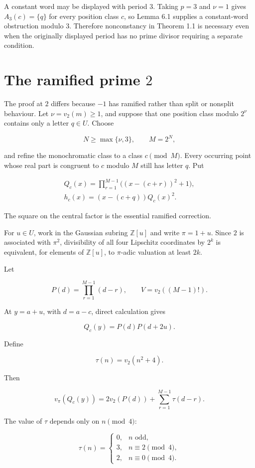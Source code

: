 \documentclass[11pt]{article}
\numberwithin{equation}{section}
\begin{document}
A constant word may be displayed with period $3$. Taking $p=3$ and $\nu=1$
gives $A_3(c)=\{q\}$ for every position class $c$, so Lemma 6.1 supplies a
constant-word obstruction modulo $3$. Therefore nonconstancy in Theorem 1.1
is necessary even when the originally displayed period has no prime divisor
requiring a separate condition.

\section{The ramified prime \texorpdfstring{$2$}{2}}


The proof at $2$ differs because $-1$ has ramified rather than split or
nonsplit behaviour. Let $\nu=v_2(m)\ge1$, and suppose that one position class
modulo $2^\nu$ contains only a letter $q\in U$. Choose

\nopagebreak[4]
\[
N\ge\max\{\nu,3\},
\qquad
M=2^N,
\]

and refine the monochromatic class to a class $c\pmod M$. Every occurring
point whose real part is congruent to $c$ modulo $M$ still has letter $q$.
Put

\nopagebreak
\[
\begin{gathered}
Q_c(x)=\prod_{r=1}^{M-1}\bigl((x-(c+r))^2+1\bigr),\\[0.4em]
h_c(x)=(x-(c+q))Q_c(x)^2.
\end{gathered}
\]

The square on the central factor is the essential ramified correction.

For $u\in U$, work in the Gaussian subring $\mathbb Z[u]$ and write
$\pi=1+u$. Since $2$ is associated with $\pi^2$, divisibility of all four
Lipschitz coordinates by $2^k$ is equivalent, for elements of
$\mathbb Z[u]$, to $\pi$-adic valuation at least $2k$.

Let

\nopagebreak[4]
\[
P(d)=\prod_{r=1}^{M-1}(d-r),
\qquad
V=v_2((M-1)!).
\]

At $y=a+u$, with $d=a-c$, direct calculation gives

\nopagebreak[4]
\[
Q_c(y)=P(d)P(d+2u).
\]

Define

\nopagebreak[4]
\[
\tau(n)=v_2(n^2+4).
\]

Then

\nopagebreak[4]
\[
v_\pi(Q_c(y))
=2v_2(P(d))+\sum_{r=1}^{M-1}\tau(d-r).
\]

The value of $\tau$ depends only on $n\pmod4$:

\nopagebreak[4]
\[
\tau(n)=
\begin{cases}
0,&n\text{ odd},\\
3,&n\equiv2\pmod4,\\
2,&n\equiv0\pmod4.
\end{cases}
\]
\end{document}
